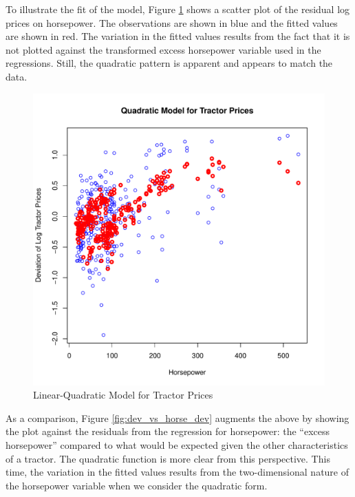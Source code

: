 \documentclass[11pt]{paper}
\begin{document}
\pagebreak 
To illustrate the fit of the model, 
Figure \ref{fig:dev_vs_horse} shows a scatter plot 
of the residual log prices on horsepower. 
The observations are shown in blue
and the fitted values are shown in red.
The variation in the fitted values results from the 
fact that it is not plotted against the transformed excess horsepower variable used in the regressions.
Still, the quadratic pattern is apparent
and appears to match the data. 

\begin{figure}[h!]
  \centering
  \includegraphics[scale = 0.5, keepaspectratio=true]{../Figures/dev_vs_horse}
  \caption{Linear-Quadratic Model for Tractor Prices} \label{fig:dev_vs_horse}
\end{figure}



\pagebreak
As a comparison, Figure \ref{fig:dev_vs_horse_dev} 
augments the above by showing the plot against the 
residuals from the regression for horsepower:
the ``excess horsepower'' compared to what would be 
expected given the other characteristics of a tractor. 
The quadratic function is more clear from this perspective. 
This time, the variation in the fitted values results from the 
two-dimensional nature of the horsepower variable
when we consider the quadratic form.
\end{document}
